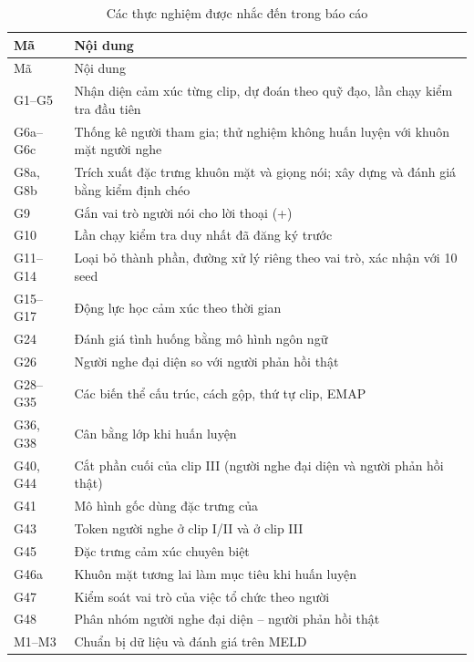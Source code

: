 {\fontsize{12}{14}\selectfont
\begin{longtable}{>{\raggedright}p{2cm}>{\raggedright\arraybackslash}p{12.5cm}}
\caption{Các thực nghiệm được nhắc đến trong báo cáo}\label{tab:notebooks}\\
\toprule
Mã & Nội dung \\
\midrule
\endfirsthead
\toprule
Mã & Nội dung \\
\midrule
\endhead
G1--G5 & Nhận diện cảm xúc từng clip, dự đoán theo quỹ đạo, lần chạy kiểm tra đầu tiên \\
G6a--G6c & Thống kê người tham gia; thử nghiệm không huấn luyện với khuôn mặt người nghe \\
G8a, G8b & Trích xuất đặc trưng khuôn mặt và giọng nói; xây dựng và đánh giá \model{} bằng kiểm định chéo \\
G9 & Gắn vai trò người nói cho lời thoại (\model{}+) \\
G10 & Lần chạy kiểm tra duy nhất đã đăng ký trước \\
G11--G14 & Loại bỏ thành phần, đường xử lý riêng theo vai trò, xác nhận với 10 seed \\
G15--G17 & Động lực học cảm xúc theo thời gian \\
G24 & Đánh giá tình huống bằng mô hình ngôn ngữ \\
G26 & Người nghe đại diện so với người phản hồi thật \\
G28--G35 & Các biến thể cấu trúc, cách gộp, thứ tự clip, EMAP \\
G36, G38 & Cân bằng lớp khi huấn luyện \\
G40, G44 & Cắt phần cuối của clip III (người nghe đại diện và người phản hồi thật) \\
G41 & Mô hình gốc dùng đặc trưng của \model{} \\
G43 & Token người nghe ở clip I/II và ở clip III \\
G45 & Đặc trưng cảm xúc chuyên biệt \\
G46a & Khuôn mặt tương lai làm mục tiêu khi huấn luyện \\
G47 & Kiểm soát vai trò của việc tổ chức theo người \\
G48 & Phân nhóm người nghe đại diện -- người phản hồi thật \\
M1--M3 & Chuẩn bị dữ liệu và đánh giá trên MELD \\
\bottomrule
\end{longtable}}
